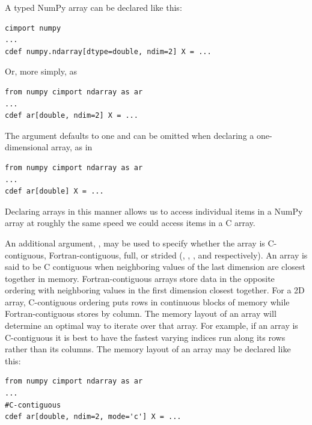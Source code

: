 A typed NumPy array can be declared like this:
\begin{lstlisting}
cimport numpy
...
cdef numpy.ndarray[dtype=double, ndim=2] X = ...
\end{lstlisting}
Or, more simply, as
\begin{lstlisting}
from numpy cimport ndarray as ar
...
cdef ar[double, ndim=2] X = ...
\end{lstlisting}
The  argument defaults to one and can be omitted when declaring a one-dimensional array, as in
\begin{lstlisting}
from numpy cimport ndarray as ar
...
cdef ar[double] X = ...
\end{lstlisting}
Declaring arrays in this manner allows us to access individual items in a NumPy array at roughly the same speed we could access items in a C array.

An additional argument, , may be used to specify whether the array is C-contiguous, Fortran-contiguous, full, or strided (, , , and  respectively).
An array is said to be C contiguous when neighboring values of the last dimension are closest together in memory.
Fortran-contiguous arrays store data in the opposite ordering with neighboring values in the first dimension closest together.
For a 2D array, C-contiguous ordering puts rows in continuous blocks of memory while Fortran-contiguous stores by column.
The memory layout of an array will determine an optimal way to iterate over that array.
For example, if an array is C-contiguous it is best to have the fastest varying indices run along its rows rather than its columns.
The memory layout of an array may be declared like this:
\begin{lstlisting}
from numpy cimport ndarray as ar
...
#C-contiguous
cdef ar[double, ndim=2, mode='c'] X = ...
\end{lstlisting}

